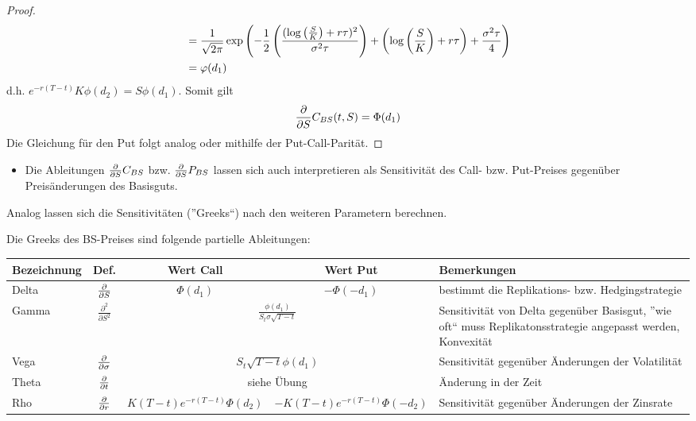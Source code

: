 \begin{proof}
\begin{align*}
		&= \frac{1}{\sqrt{2\pi}} \exp\left( -\frac{1}{2} \left( \frac{(\log\left( \frac{S}{K} \right) + r \tau)^2}{\sigma^2 \tau} \right) + \left( \log\left( \frac{S}{K} \right) + r \tau \right) + \frac{\sigma^2 \tau}{4} \right) \\
		&= \varphi(d_1)
	\end{align*}
	d.h. $e^{-r (T-t)} K \phi(d_2) = S \phi(d_1)$. Somit gilt
	\begin{equation*}
		\frac{\partial}{\partial S } C_{BS}(t,S) = \Phi(d_1)
	\end{equation*}
	Die Gleichung für den Put folgt analog oder mithilfe der Put-Call-Parität.
\end{proof}

\begin{*bemerkung}
	\begin{itemize}[nolistsep]
		\item Die Ableitungen $\frac{\partial}{\partial S } C_{BS}$ bzw. $\frac{\partial}{\partial S } P_{BS}$ lassen sich auch interpretieren als Sensitivität des Call- bzw. Put-Preises gegenüber Preisänderungen des Basisguts.
	\end{itemize}
\end{*bemerkung}

Analog lassen sich die Sensitivitäten (''Greeks``) nach den weiteren Parametern berechnen.

\begin{*definition}
	Die Greeks des BS-Preises sind folgende partielle Ableitungen:
\end{*definition}

\begin{tabular}{|l|c|c|c|l|}
	\hline
	Bezeichnung & Def. & Wert Call & Wert Put & Bemerkungen \\
	\hline \hline
	Delta & $\frac{\partial}{\partial S }$ & $\Phi(d_1)$ & $-\Phi(-d_1)$ & bestimmt die Replikations- bzw. Hedgingstrategie \\ \hline
	Gamma & $\frac{\partial^2}{\partial S^2}$ & \multicolumn{2}{c|}{$\frac{\phi(d_1)}{S_t \sigma \sqrt{T - t}}$} & Sensitivität von Delta gegenüber Basisgut, ''wie oft`` muss Replikatonsstrategie angepasst werden, Konvexität \\ \hline
	Vega & $\frac{\partial}{\partial \sigma }$ & \multicolumn{2}{c|}{$S_t \sqrt{T -t} \phi(d_1)$} & Sensitivität gegenüber Änderungen der Volatilität \\ \hline
	Theta & $\frac{\partial}{\partial t }$ & \multicolumn{2}{c|}{siehe Übung} & Änderung in der Zeit \\ \hline
	Rho & $\frac{\partial}{\partial r }$ & $K (T - t)e^{-r(T-t)} \Phi(d_2)$ & $- K (T - t)e^{-r(T-t)} \Phi(-d_2)$ & Sensitivität gegenüber Änderungen der Zinsrate \\ \hline	
\end{tabular}


